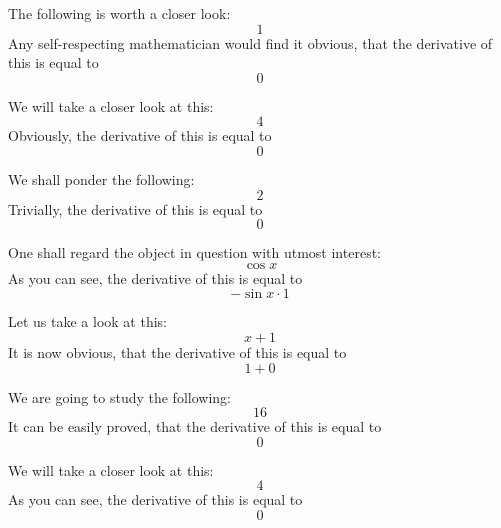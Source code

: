 \documentclass{article}
\begin{document}
The following is worth a closer look:
\begin{equation}
1 
\end{equation}
Any self-respecting mathematician would find it obvious, that the derivative of this is equal to
\begin{equation}
0 
\end{equation}

We will take a closer look at this:
\begin{equation}
4 
\end{equation}
Obviously, the derivative of this is equal to
\begin{equation}
0 
\end{equation}

We shall ponder the following:
\begin{equation}
2 
\end{equation}
Trivially, the derivative of this is equal to
\begin{equation}
0 
\end{equation}

One shall regard the object in question with utmost interest:
\begin{equation}
\cos x 
\end{equation}
As you can see, the derivative of this is equal to
\begin{equation}
-\sin x \cdot 1 
\end{equation}

Let us take a look at this:
\begin{equation}
x + 1 
\end{equation}
It is now obvious, that the derivative of this is equal to
\begin{equation}
1 + 0 
\end{equation}

We are going to study the following:
\begin{equation}
16 
\end{equation}
It can be easily proved, that the derivative of this is equal to
\begin{equation}
0 
\end{equation}

We will take a closer look at this:
\begin{equation}
4 
\end{equation}
As you can see, the derivative of this is equal to
\begin{equation}
0 
\end{equation}
\end{document}
